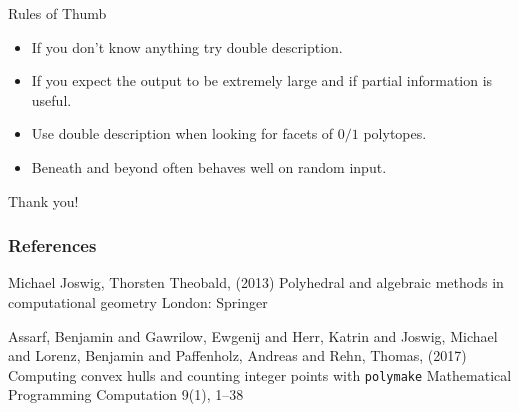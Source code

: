 \documentclass[9pt]{beamer}
\theoremstyle{definition}
\begin{document}

\begin{frame}[fragile]{Rules of Thumb}
  \begin{itemize}
  \item If you don't know anything try double description.
  \item If you expect the output to be extremely large and if partial information is
    useful.
  \item Use double description when looking for facets of $0 / 1$ polytopes.
  \item Beneath and beyond often behaves well on random input.
  \end{itemize}

\end{frame}


\begin{frame}[fragile]
  \begin{center}
    Thank you!
  \end{center}
\end{frame}

\begin{frame}
  \frametitle{References}
  \footnotesize{
    \begin{thebibliography}{99} %
     Michael Joswig, Thorsten Theobald, (2013)
      \newblock Polyhedral and algebraic methods in computational geometry
      \newblock London: Springer

     Assarf, Benjamin and Gawrilow, Ewgenij and Herr, Katrin and Joswig, Michael and Lorenz, Benjamin and Paffenholz, Andreas and Rehn, Thomas, (2017)
      \newblock Computing convex hulls and counting integer points with \texttt{polymake}
      \newblock Mathematical Programming Computation 9(1), 1--38 



  \end{thebibliography}
  }
\end{frame}

\end{document}
